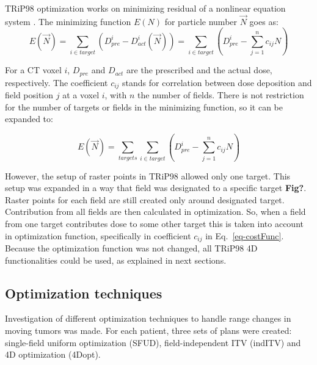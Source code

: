 \documentclass[type=dr, dr=rernat, accentcolor=tud7b,colorbacktitle, bigchapter, openright, twoside, 12pt ]{tudthesis}
\begin{document}
TRiP98 optimization works on minimizing residual of a nonlinear equation system \cite{Kraemer2000a}. The minimizing function $E(N)$ for particle number $\vec{N}$ goes as:
\begin{equation}
\label{eq-costFunc}
 E(\vec{N}) = \sum_{i\in target} \left( D_{pre}^{i} - D_{act}^{i}(\vec{N})\right) = \sum_{i\in target} \left( D_{pre}^{i} -\sum_{j=1}^n c_{ij}N\right)
\end{equation}

For a CT voxel $i$, $ D_{pre}$ and $D_{act}$ are the prescribed and the actual dose, respectively. The coefficient $c_{ij}$ stands for correlation between dose deposition and field position $j$ at a voxel $i$, with $n$ the number of fields. There is not restriction for the number of targets or fields in the minimizing function, so it can be expanded to:

\begin{equation}
\label{eq-multiCost}
 E(\vec{N}) = \sum_{targets} \sum_{i\in target} \left( D_{pre}^{i} -\sum_{j=1}^n c_{ij}N\right)
\end{equation}

However, the setup of raster points in TRiP98 allowed only one target. This setup was expanded in a way that field was designated to a specific target \textbf{Fig?}. Raster points for each field are still created only around designated target. Contribution from all fields are then calculated in optimization. So, when a field from one target contributes dose to some other target this is taken into account in optimization function, specifically in coefficient $c_{ij}$ in Eq.~\ref{eq-costFunc}. Because the optimization function was not changed, all TRiP98 4D functionalities could be used, as explained in next sections.

\subsection{Optimization techniques}

Investigation of different optimization techniques to handle range changes in moving tumors was made. For each patient, three sets of plans were created: single-field uniform optimization (SFUD), field-independent ITV (indITV) and 4D optimization (4Dopt). 
\end{document}
